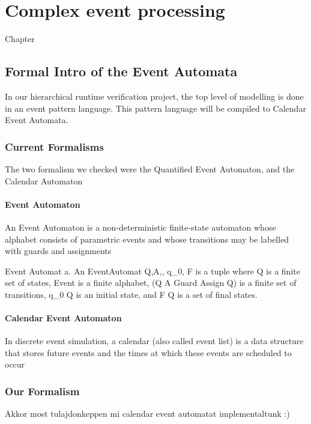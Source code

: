 \chapter{Complex event processing}
\label{chap:cep}

Chapter
\section{Formal Intro of the Event Automata}
	In our hierarchical runtime verification project, the top level of modelling is done in an event pattern language.
	This pattern language will be compiled to Calendar Event Automata.
	\subsection{Current Formalisms}
		The two formalism we checked were the Quantified Event Automaton, and the Calendar Automaton
		\subsubsection{Event Automaton}
			An Event Automaton is a non-deterministic finite-state automaton whose alphabet consists
			of parametric events and whose transitions may be labelled with guards and assignments
			
			\begin{dfn}
			Event Automat a. An EventAutomat \langle Q,A,\delta, q_0, F \rangle
			is a tuple where Q is a finite set of states,  \subseteq
			Event is a finite alphabet, \delta \in (Q \texttimes A \texttimes Guard \texttimes Assign \texttimes Q)
			is a finite set of transitions, q_0 \in Q is an initial state, and F \subseteq Q is a set of final states.
			\end{dfn}
			
		\subsubsection{Calendar Event Automaton}
			In discrete event simulation, a calendar (also called event list) is a data structure that
			stores future events and the times at which these events are scheduled to occur
			
	\subsection{Our Formalism}
		Akkor most tulajdonkeppen mi calendar event automatat implementaltunk :) 
